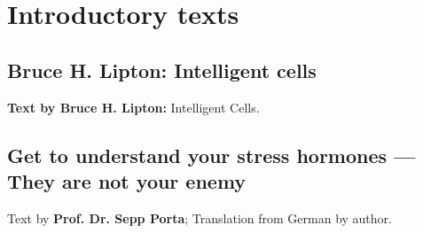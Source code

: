 \documentclass[../main.tex]{subfiles}
\begin{document}
\chapter{Introductory texts}
\section*{Bruce H. Lipton: Intelligent cells}

\textbf{Text by Bruce H. Lipton:} Intelligent Cells.
\newpage{}
\section*{Get to understand your stress hormones --- They are not your enemy}
Text by \textbf{Prof. Dr. Sepp Porta}; Translation from German by author.

\end{document}
